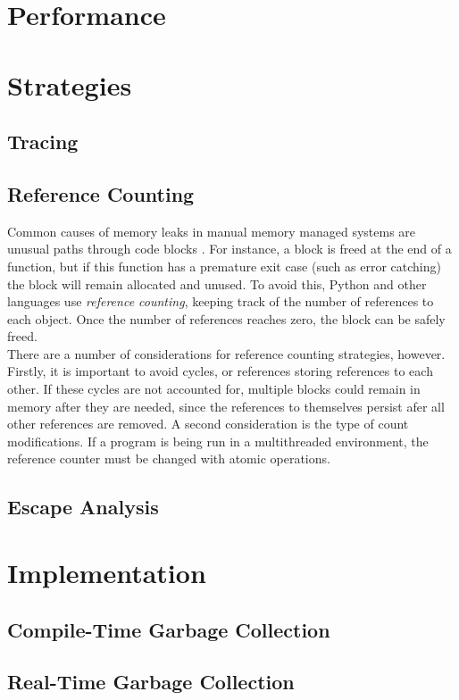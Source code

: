 \documentclass[12pt]{article}
\begin{document}
\section{Performance}

\section{Strategies}
\subsection{Tracing}
\subsection{Reference Counting}
Common causes of memory leaks in manual memory managed systems are unusual paths through code blocks \cite{pythDocs}. For instance, a block is freed at the end of a function, but if this function has a premature exit case (such as error catching) the block will remain allocated and unused. To avoid this, Python and other languages use {\it reference counting}, keeping track of the number of references to each object. Once the number of references reaches zero, the block can be safely freed.\\

There are a number of considerations for reference counting strategies, however. Firstly, it is important to avoid cycles, or references storing references to each other. If these cycles are not accounted for, multiple blocks could remain in memory after they are needed, since the references to themselves persist afer all other references are removed. A second consideration is the type of count modifications. If a program is being run in a multithreaded environment, the reference counter must be changed with atomic operations.\\
\subsection{Escape Analysis}

\section{Implementation}
\subsection{Compile-Time Garbage Collection}
\subsection{Real-Time Garbage Collection}
\end{document}
